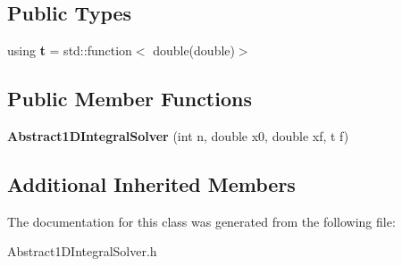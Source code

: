 \subsection*{Public Types}
\begin{DoxyCompactItemize}
\item 
\mbox{\label{class_abstract1_d_integral_solver_a7d8e60dfe7eb70e5c19dd71ac0b03880}} 
using {\bfseries t} = std\+::function$<$ double(double)$>$
\end{DoxyCompactItemize}
\subsection*{Public Member Functions}
\begin{DoxyCompactItemize}
\item 
\mbox{\label{class_abstract1_d_integral_solver_aff8ede805704db176953095b7578db37}} 
{\bfseries Abstract1\+D\+Integral\+Solver} (int n, double x0, double xf, t f)
\end{DoxyCompactItemize}
\subsection*{Additional Inherited Members}


The documentation for this class was generated from the following file\+:\begin{DoxyCompactItemize}
\item 
Abstract1\+D\+Integral\+Solver.\+h\end{DoxyCompactItemize}

